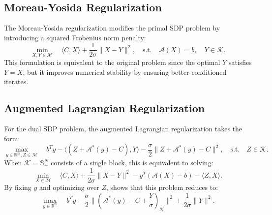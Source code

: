 \documentclass[12pt]{l4dc2021}
\begin{document}
    \subsection{Moreau-Yosida Regularization}
        The Moreau-Yosida regularization modifies the primal SDP problem by introducing a squared Frobenius norm penalty:
        \begin{equation}
            \min_{X, Y \in \mathcal{M}} \quad \langle C,X \rangle + \frac{1}{2\sigma} \|X - Y\|^2, \quad \text{s.t.} \quad \mathcal{A}(X) = b, \quad Y \in \mathcal{K}.
        \end{equation}
        This formulation is equivalent to the original problem since the optimal \( Y \) satisfies \( Y = X \), but it improves numerical stability by ensuring better-conditioned iterates.
    
    \subsection{Augmented Lagrangian Regularization}
        For the dual SDP problem, the augmented Lagrangian regularization takes the form:
        \begin{equation}
            \max_{y \in \mathbb{R}^m, Z \in \mathcal{M}} \quad b^T y - \langle (Z + \mathcal{A}^*(y) - C), Y \rangle - \frac{\sigma}{2}\|Z + \mathcal{A}^*(y) - C\|^2, \quad \text{s.t.} \quad Z \in \mathcal{K}.
        \end{equation}
        When \( \mathcal{K} = \mathbb{S}^N_+ \) consists of a single block, this is equivalent to solving:
        \begin{equation}
            \min_{X \in \mathcal{M}} \quad \langle C,X \rangle + \frac{1}{2\sigma} \|X - Y\|^2 - y^T (\mathcal{A}(X) - b) - \langle Z,X \rangle.
        \end{equation}
        By fixing \( y \) and optimizing over \( Z \), \cite{Malick2009} shows that this problem reduces to:
        \begin{equation}
            \max_{y \in \mathbb{R}^m} \quad b^T y - \frac{\sigma}{2} \| (\mathcal{A}^*(y) - C + \frac{Y}{\sigma})_\mathcal{K} \|^2 + \frac{1}{2\sigma} \|Y\|^2.
        \end{equation}
    
\end{document}
